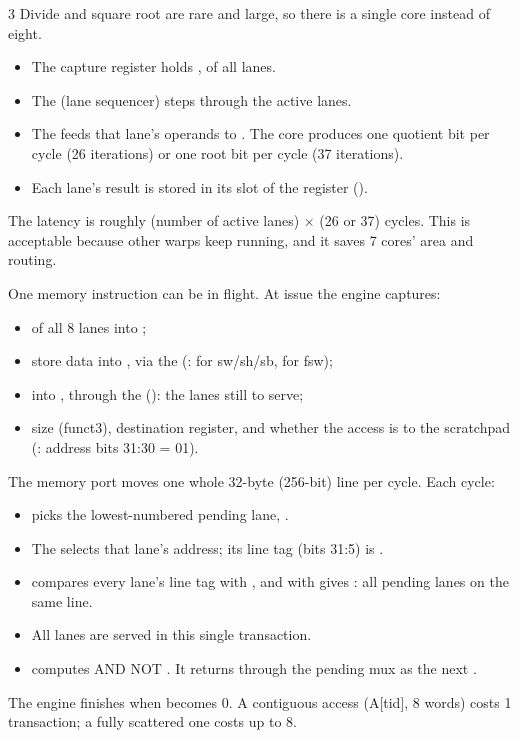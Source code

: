 \begin{multicols*}{3}
Divide and square root are rare and large, so there is a single core instead of eight.
\begin{itemize}
\item The capture register holds ,  of all lanes.
\item The  (lane sequencer) steps  through the active lanes.
\item The  feeds that lane's operands to . The core produces one quotient bit per cycle (26 iterations) or one root bit per cycle (37 iterations).
\item Each lane's result is stored in its slot of the  register ().
\end{itemize}
The latency is roughly (number of active lanes) $\times$ (26 or 37) cycles. This is acceptable because other warps keep running, and it saves 7 cores' area and routing.

One memory instruction can be in flight. At issue the engine captures:
\begin{itemize}
\item {} of all 8 lanes into ;
\item store data into , via the  (:  for sw/sh/sb,  for fsw);
\item {} into , through the  (): the lanes still to serve;
\item size (funct3), destination register, and whether the access is to the scratchpad (: address bits 31:30 = 01).
\end{itemize}

The memory port moves one whole 32-byte (256-bit) line per cycle. Each cycle:
\begin{itemize}
\item {} picks the lowest-numbered pending lane, .
\item The  selects that lane's address; its line tag (bits 31:5) is .
\item {} compares every lane's line tag with , and  with  gives : all pending lanes on the same line.
\item All  lanes are served in this single transaction.
\item {} computes  AND NOT . It returns through the pending mux as the next .
\end{itemize}
The engine finishes when  becomes 0. A contiguous access (A[tid], 8 words) costs 1 transaction; a fully scattered one costs up to 8.


\end{multicols*}
